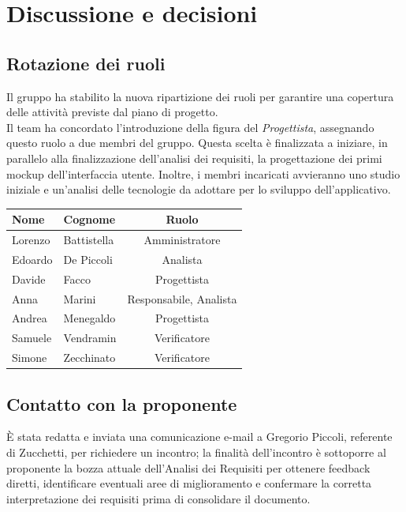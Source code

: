 \documentclass[a4paper, 10pt, colorlinks=true, linkcolor=black, urlcolor=blue, citecolor=blue, hidelinks]{article}
\begin{document}
\section{Discussione e decisioni}

\subsection{Rotazione dei ruoli}
Il gruppo ha stabilito la nuova ripartizione dei ruoli per garantire una copertura delle attività previste dal piano di progetto. \\
Il team ha concordato l'introduzione della figura del \textit{Progettista}, assegnando questo ruolo a due membri del gruppo. 
Questa scelta è finalizzata a iniziare, in parallelo alla finalizzazione dell'analisi dei requisiti, la progettazione dei primi mockup dell'interfaccia utente. Inoltre, i membri incaricati avvieranno uno studio iniziale e un'analisi delle tecnologie da adottare per lo sviluppo dell'applicativo.
\begin{center}
    \begin{tabular}{|l|l|c|}
        \hline
        \textbf{Nome} & \textbf{Cognome} & \textbf{Ruolo} \\
        \hline
        Lorenzo & Battistella & Amministratore \\
        \hline
        Edoardo & De Piccoli & Analista \\
        \hline
        Davide & Facco & Progettista \\ 
        \hline
        Anna & Marini & Responsabile, Analista \\
        \hline
        Andrea & Menegaldo & Progettista \\
        \hline
        Samuele & Vendramin & Verificatore \\        
        \hline  
        Simone & Zecchinato & Verificatore \\
        \hline  
    \end{tabular}
\end{center}

\subsection{Contatto con la proponente}
È stata redatta e inviata una comunicazione e-mail a Gregorio Piccoli, referente di Zucchetti, per richiedere un incontro; la finalità dell'incontro è sottoporre al proponente la bozza attuale dell'Analisi dei Requisiti per ottenere feedback diretti, identificare eventuali aree di miglioramento e confermare la corretta interpretazione dei requisiti prima di consolidare il documento.
\end{document}

